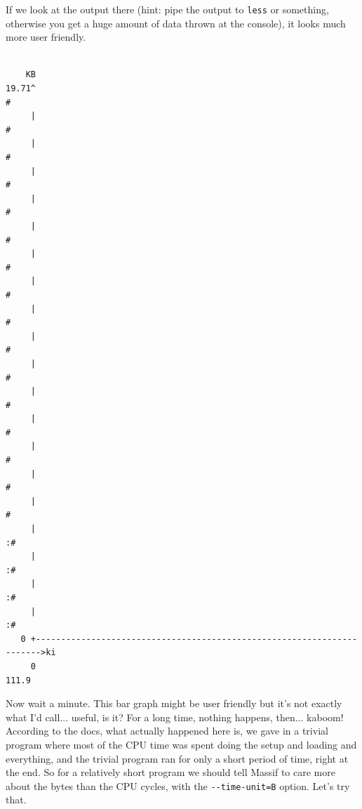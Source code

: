 \documentclass[a4paper]{report}
\begin{document}
If we look at the output there (hint: pipe the output to \texttt{less} or something, otherwise you get a huge amount of data thrown at the console), it looks much more user friendly.

{\scriptsize
\begin{verbatim}

    KB
19.71^                                                                       #
     |                                                                       #
     |                                                                       #
     |                                                                       #
     |                                                                       #
     |                                                                       #
     |                                                                       #
     |                                                                       #
     |                                                                       #
     |                                                                       #
     |                                                                       #
     |                                                                       #
     |                                                                       #
     |                                                                       #
     |                                                                       #
     |                                                                       #
     |                                                                      :#
     |                                                                      :#
     |                                                                      :#
     |                                                                      :#
   0 +----------------------------------------------------------------------->ki
     0                                                                   111.9
\end{verbatim}
}

Now wait a minute. This bar graph might be user friendly but it's not exactly what I'd call... useful, is it? For a long time, nothing happens, then... kaboom! According to the docs, what actually happened here is, we gave in a trivial program where most of the CPU time was spent doing the setup and loading and everything, and the trivial program ran for only a short period of time, right at the end. So for a relatively short program we should tell Massif to care more about the bytes than the CPU cycles, with the \verb+--time-unit=B+ option. Let's try that.
\end{document}
